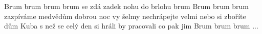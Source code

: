 \begin{TEXT}{Brum brum brum}
\SLOKA {} brum 
 se zdá 
 zadek nohu
 do brlohu
 brum 
\SLOKA Brum brum brum
zazpíváme medvědům
dobrou noc vy šelmy
nechrápejte velmi
nebo si zboříte dům
\SLOKA {} Kuba s 
 než se 
celý den si hráli
 by pracovali
 co pak jim 
\SLOKA Brum brum brum ...
\end{TEXT}